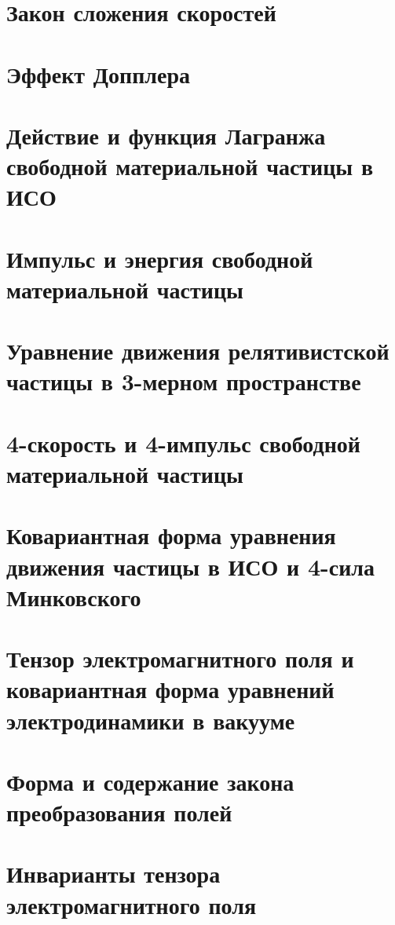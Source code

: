 \begin{multicols*}{2}
		\section{Закон сложения скоростей}
		
		\section{Эффект Допплера}
		
		\section{Действие и функция Лагранжа свободной материальной частицы в ИСО}
		
		\section{Импульс и энергия свободной материальной частицы}
		
		\section{Уравнение движения релятивистской частицы в 3-мерном пространстве}
		
		\section{4-скорость и 4-импульс свободной материальной частицы}
		
		\section{Ковариантная форма уравнения движения частицы в ИСО и 4-сила Минковского}
		
		\section{Тензор электромагнитного поля и ковариантная форма уравнений электродинамики в вакууме}
		
		\section{Форма и содержание закона преобразования полей}
		
		\section{Инварианты тензора электромагнитного поля}
		

\end{multicols*}
